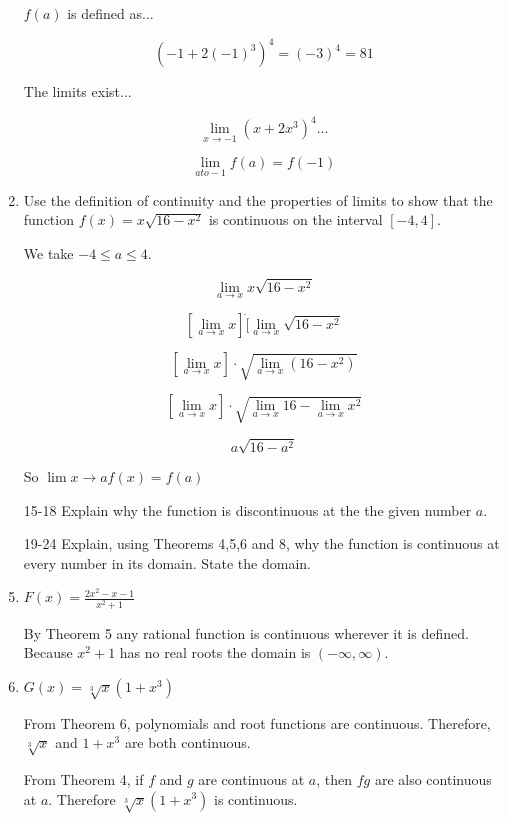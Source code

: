 \documentclass{article}
\begin{document}
\begin{enumerate}
				$f(a)$ is defined as...

				$$(-1 + 2(-1)^3)^4 = (-3)^4 = 81$$

				The limits exist...

				$$\lim \limits _{x \to -1} (x + 2x^3)^4 ...$$

				$$\lim \limits _{a to -1} f(a) = f(-1)$$ 


			\item Use the definition of continuity and the properties of
				limits to show that the function $f(x) = x\sqrt{16 - x^2}$
				is continuous on the interval $[-4,4]$.	

				We take $-4 \leq a \leq 4$.

				$$\lim \limits _{a \to x} x\sqrt{16 - x^2}$$

				$$[\lim \limits _{a \to x} x ] \dot [\lim \limits _{a \to x } \sqrt{16 - x^2}$$

				$$[\lim \limits _{a \to x} x] \cdot \sqrt{  \lim \limits _{a \to x} (16-x^{2})}$$

				$$[\lim \limits _{a \to x} x] \cdot \sqrt{ \lim \limits _{a \to x} 16 - \lim \limits _{a \to x} x^{2}}$$
				
				$$ a \sqrt{16 - a^2}$$

				So $\lim \limits {x \to a} f(x) = f(a)$

			\item[15-18] Explain why the function is discontinuous at the
				the given number $a$.

			\item[19-24] Explain, using Theorems 4,5,6 and 8, why the function
				is continuous at every number in its domain. State the domain.

			\item $F(x) = \frac{2x^2 - x - 1}{x^2 + 1}$

				By Theorem 5 any rational function is continuous wherever
				it is defined. Because $x^2 + 1$ has no real roots the
				domain is $(-\infty, \infty)$.
				
			\item $G(x) = \sqrt[3]{x}(1+x^3)$

			From Theorem 6, polynomials and root functions are continuous.
			Therefore, $\sqrt[3]{x}$ and $1 + x^3$ are both continuous.

			From Theorem 4, if $f$ and $g$ are continuous at $a$, then
			$fg$ are also continuous at $a$. Therefore $\sqrt[3]{x}(1+x^3)$
			is continuous. 


\end{enumerate}
\end{document}
